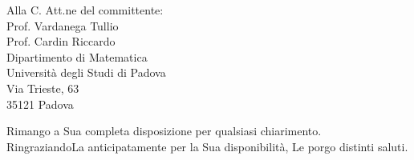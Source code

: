 \documentclass[a4paper,12pt]{letteracdp}
\begin{document}
\begin{letter}{
		Alla C. Att.ne del committente: \\
		Prof. Vardanega Tullio \\
		Prof. Cardin Riccardo \\
		Dipartimento di Matematica \\
		Università degli Studi di Padova \\
		Via Trieste, 63 \\
		35121 Padova}
		\closing{Rimango a Sua completa disposizione per qualsiasi chiarimento. \\
		RingraziandoLa anticipatamente per la Sua disponibilità, Le porgo distinti saluti.}
		
	\end{letter}
\end{document}
